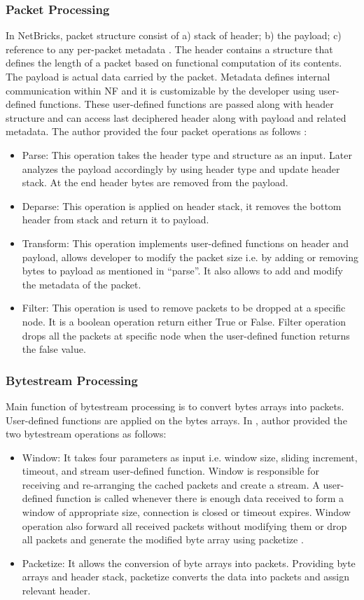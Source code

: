 \documentclass[10pt, a4paper, conference]{IEEEtran}
\begin{document}
\subsubsection{Packet Processing}
In NetBricks, packet structure consist of a) stack of header; b) the payload; c) reference to any per-packet metadata \cite{Panda2016}. The header contains a structure that defines the length of a packet based on functional computation of its contents. The payload is actual data carried by the packet. Metadata defines internal communication within NF and it is customizable by the developer using user-defined functions. These user-defined functions are passed along with header structure and can access last deciphered header along with payload and related metadata. The author provided the four packet operations as follows \cite{Panda2016}: 
\begin{itemize}

\item Parse: This operation takes the header type and structure as an input. Later analyzes the payload accordingly by using header type and update header stack. At the end header bytes are removed from the payload.

\item Deparse: This operation is applied on header stack, it removes the bottom header from stack and return it to payload. 
\item Transform:  This operation implements user-defined functions on header and payload, allows developer to modify the packet size i.e. by adding or removing bytes to payload as mentioned in “parse”. It also allows to add and modify the metadata of the packet. 
\item Filter: This operation is used to remove packets to be dropped at a specific node. It is a boolean operation return either True or False. Filter operation drops all the packets at specific node when the user-defined function returns the false value.
\end{itemize}
\subsubsection{Bytestream Processing}
Main function of bytestream processing is to convert bytes arrays into packets. User-defined functions are applied on the bytes arrays. In \cite{Panda2016}, author provided the two bytestream operations as follows: 
\begin{itemize}
\item Window: It takes four parameters as input i.e. window size, sliding increment, timeout, and stream user-defined function. Window is responsible for receiving and re-arranging the cached packets and create a stream. A user-defined function is called whenever there is enough data received to form a window of appropriate size, connection is closed or timeout expires. Window operation also forward all received packets without modifying them or drop all packets and generate the modified byte array using packetize \cite{Panda2016}. 
\item Packetize: It allows the conversion of byte arrays into packets. Providing byte arrays and header stack, packetize converts the data into packets and assign relevant header\cite{Panda2016}.
\end{itemize}
\end{document}
